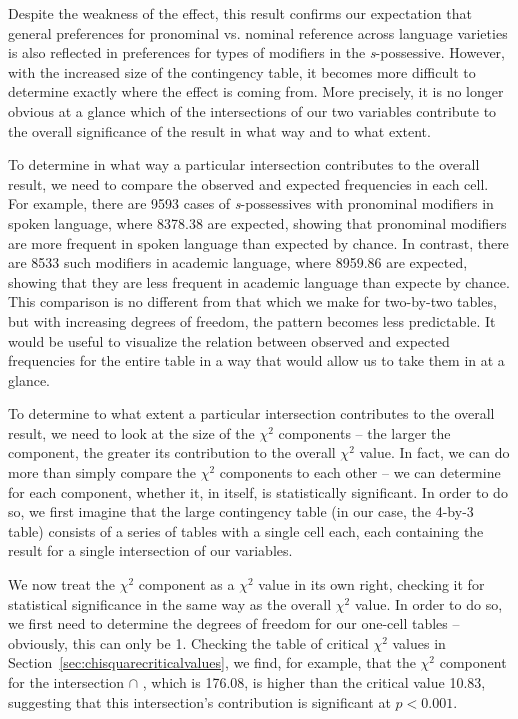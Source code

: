 Despite the weakness of the effect, this result confirms our expectation that general preferences for pronominal  vs. nominal  reference across language varieties  is also reflected in preferences for types of modifiers in the \textit{s}-possessive.  However, with the increased size of the contingency  table, it becomes more difficult to determine exactly where the effect is coming from. More precisely, it is no longer obvious at a glance which of the intersections of our two variables contribute to the overall significance  of the result in what way and to what extent.

To determine in what way a particular intersection contributes to the overall result, we need to compare the observed and expected  frequencies in each cell. For example, there are 9593 cases of \textit{s}-possessives  with pronominal modifiers in spoken  language, where 8378.38 are expected, showing that pronominal  modifiers are more frequent in spoken language than expected by chance.  In contrast, there are 8533 such modifiers in academic  language, where 8959.86 are expected, showing that they are less frequent in academic language than expecte by chance. This comparison is no different from that which we make for two\hyp{}by\hyp{}two tables, but with increasing degrees of freedom, the pattern becomes less predictable. It would be useful to visualize the relation between observed and expected  frequencies for the entire table in a way that would allow us to take them in at a glance.

To determine to what extent a particular intersection contributes to the overall result, we need to look at the size of the $\chi^2$ components -- the larger the component, the greater its contribution to the overall $\chi^2$  value. In fact, we can do more than simply compare the $\chi^2$ components to each other -- we can determine for each component, whether it, in itself, is statistically significant.  In order to do so, we first imagine that the large contingency  table (in our case, the 4\hyp{}by\hyp{}3 table) consists of a series of tables with a single cell each, each containing the result for a single intersection of our variables.

We now treat the $\chi^2$ component as a $\chi^2$ value in its own right, checking it for statistical significance  in the same way as the overall $\chi^2$ value. In order to do so, we first need to determine the degrees of freedom for our one\hyp{}cell tables -- obviously, this can only be 1. Checking the table of critical $\chi^2$  values in Section~\ref{sec:chisquarecriticalvalues}, we find, for example, that the $\chi^2$ component for the intersection   $\cap$ ,  which is 176.08, is higher than the critical value 10.83, suggesting that this intersection's contribution is significant  at $p < 0.001$.

